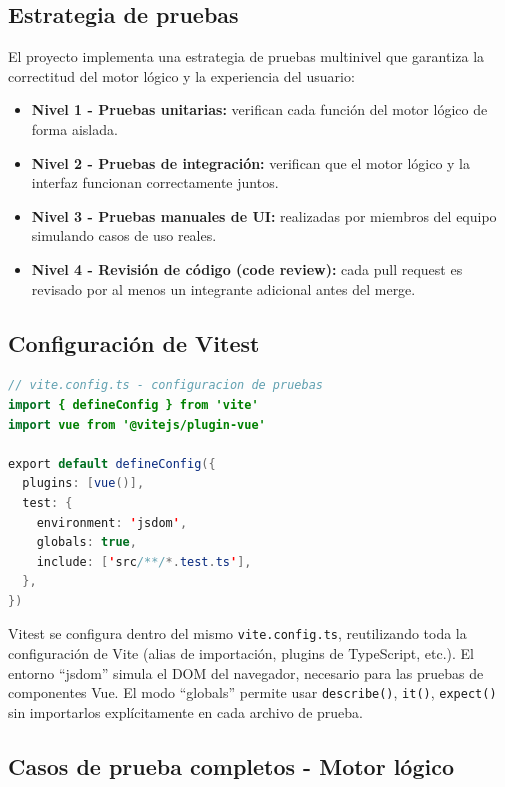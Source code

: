 \documentclass[11pt,a4paper]{article}
\begin{document}
\subsection{Estrategia de pruebas}
El proyecto implementa una estrategia de pruebas multinivel que garantiza la correctitud del motor lógico y la experiencia del usuario:
\begin{itemize}[noitemsep]
    \item \textbf{Nivel 1 - Pruebas unitarias:} verifican cada función del motor lógico de forma aislada.
    \item \textbf{Nivel 2 - Pruebas de integración:} verifican que el motor lógico y la interfaz funcionan correctamente juntos.
    \item \textbf{Nivel 3 - Pruebas manuales de UI:} realizadas por miembros del equipo simulando casos de uso reales.
    \item \textbf{Nivel 4 - Revisión de código (code review):} cada pull request es revisado por al menos un integrante adicional antes del merge.
\end{itemize}

\subsection{Configuración de Vitest}
\begin{lstlisting}[language=Java, caption={vite.config.ts - configuración Vitest}]
// vite.config.ts - configuracion de pruebas
import { defineConfig } from 'vite'
import vue from '@vitejs/plugin-vue'

export default defineConfig({
  plugins: [vue()],
  test: {
    environment: 'jsdom',
    globals: true,
    include: ['src/**/*.test.ts'],
  },
})
\end{lstlisting}
Vitest se configura dentro del mismo \texttt{vite.config.ts}, reutilizando toda la configuración de Vite (alias de importación, plugins de TypeScript, etc.). El entorno ``jsdom'' simula el DOM del navegador, necesario para las pruebas de componentes Vue. El modo ``globals'' permite usar \texttt{describe()}, \texttt{it()}, \texttt{expect()} sin importarlos explícitamente en cada archivo de prueba.

\subsection{Casos de prueba completos - Motor lógico}
\end{document}
